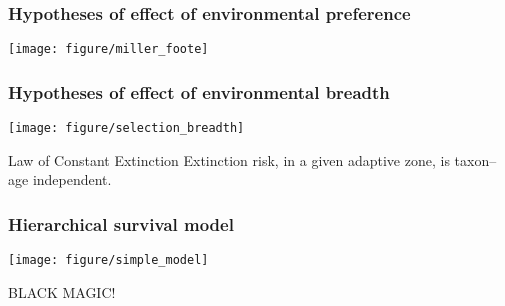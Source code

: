 \documentclass{beamer}
\begin{document}
\begin{frame}
  \frametitle{Hypotheses of effect of environmental preference}
  \texttt{[image: figure/miller\_foote]}

\end{frame}

\begin{frame}
  \frametitle{Hypotheses of effect of environmental breadth}

  \begin{center}
    \texttt{[image: figure/selection\_breadth]}
  \end{center}
\end{frame}

\begin{frame}
  \begin{block}{Law of Constant Extinction}
    Extinction risk, in a given adaptive zone, is taxon--age independent.
  \end{block}
  
  \tiny{}
\end{frame}

\begin{frame}
  \frametitle{Hierarchical survival model}
  \begin{center}
    \texttt{[image: figure/simple\_model]}
  \end{center}
\end{frame}

\begin{frame}
  \begin{LARGE}
    \uppercase{\alert{black magic!}}
  \end{LARGE}
\end{frame}
\end{document}
